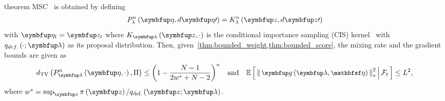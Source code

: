 
\begin{theoremEnd}{theorem}\label{thm:msc}
  MSC~\citep{NEURIPS2020_b2070693} is obtained by defining 
  {\small
  \begin{align*}
  P_{\lambda}^n\left(\veta, d\veta\prime\right)
  = 
  K_{\lambda}^n\left(\vz, d\vz\prime\right)
  \end{align*}
  }
  with  \(\veta_t = \vz_t\) where \(K_{\vlambda}\left(\vz, \cdot\right)\) is the conditional importance sampling (CIS) kernel~\citep{NEURIPS2020_b2070693} with \(q_{def.}\left(\cdot; \vlambda\right)\) as its proposal distribution.
  Then, given~\cref{thm:bounded_weight,thm:bounded_score}, the mixing rate and the gradient bounds are given as
  {\small
  \begin{align*}
  \DTV{P_{\vlambda}^n\left(\veta, \cdot\right)}{\Pi} \leq  {\left(1 - \frac{N - 1}{2 w^* + N - 2}\right)}^n\quad \text{and}\quad
  {\small
  \E{ \norm{ \vg\left(\vlambda, \rvveta\right) }_{*}^2 \,\middle|\, \mathcal{F}_{t} } \leq  L^2,
  }
  \end{align*}
  }
  where \(w^* = \sup_{\vz} \pi\left(\vz\right) / q_{\text{def.}}\left(\vz;\vlambda\right)\).
\end{theoremEnd}
